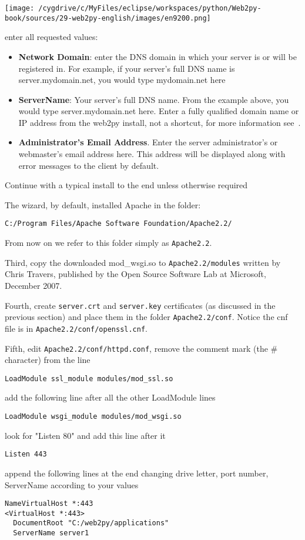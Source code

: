 \documentclass[justified,sixbynine,notoc]{tufte-book}
\def\ft{\small\tt}
\begin{document}
\begin{fullwidth}
\goodbreak\begin{center}\texttt{[image: /cygdrive/c/MyFiles/eclipse/workspaces/python/Web2py-book/sources/29-web2py-english/images/en9200.png]}\end{center}

\noindent enter all requested values:
\begin{itemize}
\item {\bf Network Domain}: enter the DNS domain in which your server is or will be registered in.  For example, if your server's full DNS name is server.mydomain.net, you would type mydomain.net here

\item {\bf ServerName}: Your server's full DNS name. From the example above, you would type server.mydomain.net here. Enter a fully qualified domain name or IP address from the web2py install, not a shortcut, for more information see~\cite{apache2}.

\item {\bf Administrator's Email Address}. Enter the server administrator's or webmaster's email address here. This address will be displayed along with error messages to the client by default.
\end{itemize}

Continue with a typical install to the end unless otherwise required

The wizard, by default, installed Apache in the folder:
\begin{lstlisting}
C:/Program Files/Apache Software Foundation/Apache2.2/
\end{lstlisting}

From now on we refer to this folder simply as {\ft Apache2.2}.

Third, copy the downloaded mod\_wsgi.so to
{\ft Apache2.2/modules}
\noindent written by Chris Travers, published by the Open Source Software Lab at Microsoft, December 2007.

Fourth, create {\ft server.crt} and {\ft server.key} certificates (as discussed in the previous section) and place them in the folder  {\ft Apache2.2/conf}. Notice the cnf file is in {\ft Apache2.2/conf/openssl.cnf}.

Fifth, edit {\ft Apache2.2/conf/httpd.conf},
remove the comment mark (the \# character) from the line
\begin{lstlisting}
LoadModule ssl_module modules/mod_ssl.so
\end{lstlisting}
\noindent add the following line after all the other LoadModule lines
\begin{lstlisting}
LoadModule wsgi_module modules/mod_wsgi.so
\end{lstlisting}
\noindent look for "Listen 80" and add this line after it
\begin{lstlisting}
Listen 443
\end{lstlisting}
\noindent append the following lines at the end changing  drive letter, port number,
ServerName according to your values
\begin{lstlisting}
NameVirtualHost *:443
<VirtualHost *:443>
  DocumentRoot "C:/web2py/applications"
  ServerName server1


\end{lstlisting}
\end{fullwidth}
\end{document}
